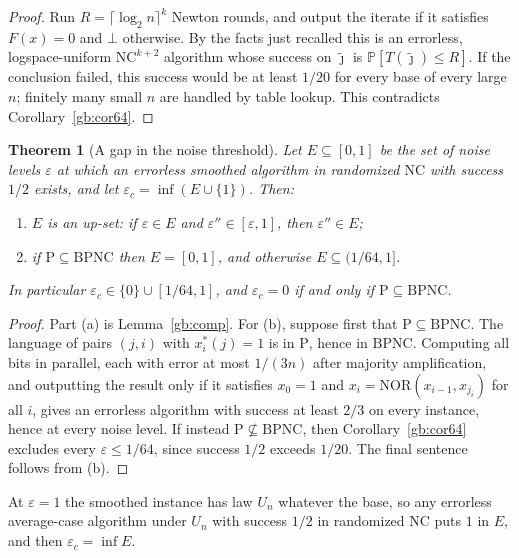 \documentclass[11pt]{amsart}
\newtheorem{theorem}{Theorem}
\theoremstyle{definition}
\theoremstyle{remark}
\newcommand{\eps}{\varepsilon}
\newcommand{\jt}{\tilde{\jmath}}
\newcommand{\NOR}{\mathrm{NOR}}
\newcommand{\PP}{\mathbb{P}}
\begin{document}
\begin{proof}
Run $R=\lceil\log_2 n\rceil^k$ Newton rounds, and output the iterate if it
satisfies $F(x)=0$ and $\bot$ otherwise. By the facts just recalled this is
an errorless, logspace-uniform $\mathrm{NC}^{k+2}$ algorithm whose success on
$\jt$ is $\PP[T(\jt)\le R]$. If the conclusion failed, this success would be
at least $1/20$ for every base of every large $n$; finitely many small $n$
are handled by table lookup. This contradicts
Corollary~\ref{gb:cor64}.
\end{proof}

\begin{theorem}[A gap in the noise threshold]\label{gb:gap}
Let $E\subseteq[0,1]$ be the set of noise levels $\eps$ at which an
errorless smoothed algorithm in randomized $\mathrm{NC}$ with success $1/2$
exists, and let $\eps_c=\inf(E\cup\{1\})$. Then:
\begin{enumerate}[label=(\alph*)]
\item $E$ is an up-set: if $\eps\in E$ and $\eps''\in[\eps,1]$, then
$\eps''\in E$;
\item if $\mathrm{P}\subseteq\mathrm{BPNC}$ then $E=[0,1]$, and otherwise
$E\subseteq(1/64,1]$.
\end{enumerate}
In particular $\eps_c\in\{0\}\cup[1/64,1]$, and $\eps_c=0$ if and only if
$\mathrm{P}\subseteq\mathrm{BPNC}$.
\end{theorem}

\begin{proof}
Part (a) is Lemma~\ref{gb:comp}. For (b), suppose first that
$\mathrm{P}\subseteq\mathrm{BPNC}$. The language of pairs $(j,i)$ with
$x^*_i(j)=1$ is in $\mathrm{P}$, hence in $\mathrm{BPNC}$. Computing all bits
in parallel, each with error at most $1/(3n)$ after majority amplification,
and outputting the result only if it satisfies $x_0=1$ and
$x_i=\NOR(x_{i-1},x_{j_i})$ for all $i$, gives an errorless algorithm with
success at least $2/3$ on every instance, hence at every noise level. If
instead $\mathrm{P}\not\subseteq\mathrm{BPNC}$, then
Corollary~\ref{gb:cor64} excludes every $\eps\le1/64$, since success $1/2$
exceeds $1/20$. The final sentence follows from (b).
\end{proof}

At $\eps=1$ the smoothed instance has law $U_n$ whatever the base, so any
errorless average-case algorithm under $U_n$ with success $1/2$ in
randomized $\mathrm{NC}$ puts $1$ in $E$, and then $\eps_c=\inf E$.
\end{document}
